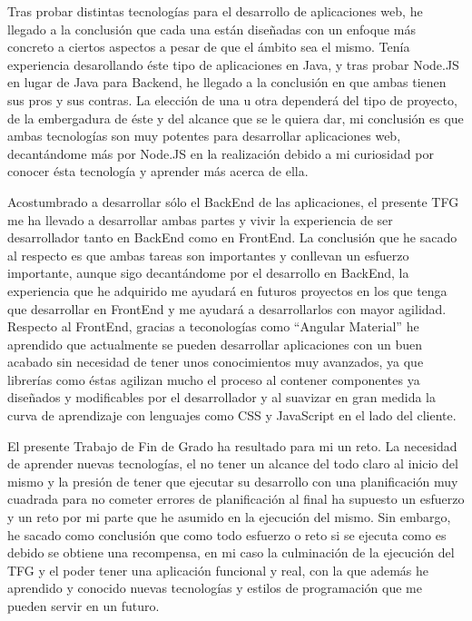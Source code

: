 \documentclass[11pt,openany]{book}
\begin{document}
Tras probar distintas tecnologías para el desarrollo de aplicaciones web, he llegado a la conclusión que cada una están diseñadas con un enfoque más concreto a ciertos aspectos a pesar de que el ámbito sea el mismo. Tenía experiencia desarollando éste tipo de aplicaciones en Java, y tras probar Node.JS en lugar de Java para Backend, he llegado a la conclusión en que ambas tienen sus pros y sus contras. La elección de una u otra dependerá del tipo de proyecto, de la embergadura de éste y del alcance que se le quiera dar, mi conclusión es que ambas tecnologías son muy potentes para desarrollar aplicaciones web, decantándome más por Node.JS en la realización debido a mi curiosidad por conocer ésta tecnología y aprender más acerca de ella.

Acostumbrado a desarrollar sólo el BackEnd de las aplicaciones, el presente TFG me ha llevado a desarrollar ambas partes y vivir la experiencia de ser desarrollador tanto en BackEnd como en FrontEnd. La conclusión que he sacado al respecto es que ambas tareas son importantes y conllevan un esfuerzo importante, aunque sigo decantándome por el desarrollo en BackEnd, la experiencia que he adquirido me ayudará en futuros proyectos en los que tenga que desarrollar en FrontEnd y me ayudará a desarrollarlos con mayor agilidad. Respecto al FrontEnd, gracias a teconologías como ``Angular Material'' he aprendido que actualmente se pueden desarrollar aplicaciones con un buen acabado sin necesidad de tener unos conocimientos muy avanzados, ya que librerías como éstas agilizan mucho el proceso al contener componentes ya diseñados y modificables por el desarrollador y al suavizar en gran medida la curva de aprendizaje con lenguajes como CSS y JavaScript en el lado del cliente.

El presente Trabajo de Fin de Grado ha resultado para mi un reto. La necesidad de aprender nuevas tecnologías, el no tener un alcance del todo claro al inicio del mismo y la presión de tener que ejecutar su desarrollo con una planificación muy cuadrada para no cometer errores de planificación al final ha supuesto un esfuerzo y un reto por mi parte que he asumido en la ejecución del mismo. Sin embargo, he sacado como conclusión que como todo esfuerzo o reto si se ejecuta como es debido se obtiene una recompensa, en mi caso la culminación de la ejecución del TFG y el poder tener una aplicación funcional y real, con la que además he aprendido y conocido nuevas tecnologías y estilos de programación que me pueden servir en un futuro. 
\end{document}
